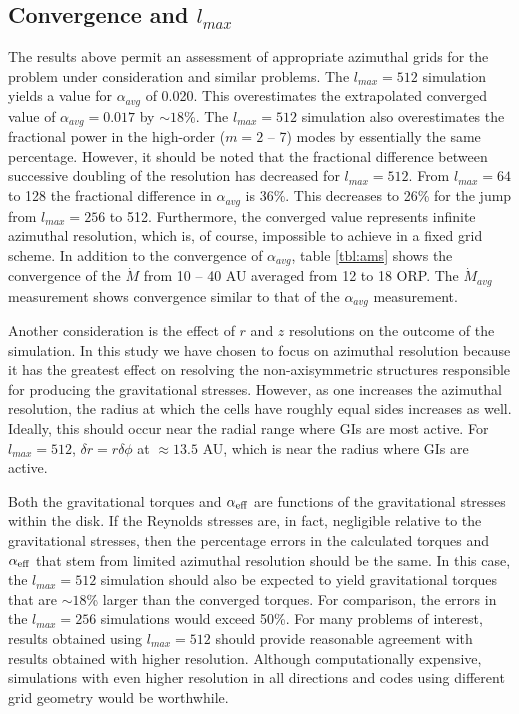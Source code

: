 \documentclass[manuscript]{aastex}
\begin{document}
\subsection{Convergence and $l_{max}$}

The results above permit an assessment of appropriate azimuthal grids for the
problem under consideration and similar problems. The $l_{max} = 512$ simulation yields a value 
for $\alpha_{avg}$ of 0.020. This overestimates the extrapolated converged value of $\alpha_{avg}
= 0.017$ by $\sim 18$\%. The $l_{max} = 512$ simulation also overestimates the fractional
power in the high-order ($m = 2$ -- 7) modes by essentially the same percentage. However, it should be noted that the fractional difference between successive doubling of the resolution has decreased for $l_{max} = 512$. From $l_{max} =64$ to 128 the fractional difference in $\alpha_{avg}$ is 36\%. This decreases to 26\% for the jump from $l_{max} = 256$ to 512. Furthermore, the converged value represents infinite azimuthal resolution, which is, of course, impossible to achieve in a fixed grid scheme. 
In addition to the convergence of $\alpha_{avg}$, table \ref{tbl:ams} shows the convergence of the $\dot{M}$
from 10 -- 40 AU averaged from 12 to 18 ORP. The $\dot{M}_{avg}$ measurement shows convergence similar to that
of the $\alpha_{avg}$ measurement.

Another consideration is the effect of $r$ and $z$ resolutions on the outcome of the simulation. In this study we have chosen to focus on azimuthal resolution because it has the greatest effect on resolving the non-axisymmetric
structures responsible for producing the gravitational stresses. However, as one increases the azimuthal resolution, the radius at which the cells have roughly equal sides increases as well. Ideally, this should occur near the radial range where GIs are most active. For $l_{max} = 512$, $\delta r = r \delta \phi $ at $\approx 13.5$ AU, which is near the radius where GIs are active.

Both the gravitational torques and $\alpha_{\rm{eff}}$ are functions of the
gravitational stresses within the disk.  If the Reynolds stresses are, in fact, negligible relative to the gravitational stresses,
then the percentage errors in the calculated torques and $\alpha_{\rm{eff}}$ that stem from limited azimuthal resolution 
should be the same. In this case, the  $l_{max} = 512$ simulation should also be expected to yield
gravitational torques that are $\sim 18$\% larger than the converged torques.  For comparison, the
errors in the $l_{max} = 256$ simulations would exceed 50\%. For many problems of interest,
results obtained using $l_{max} = 512$ should provide reasonable agreement with results obtained 
with higher resolution. 
Although computationally expensive, simulations with even higher resolution in all directions and codes using different grid geometry
would be worthwhile.
\end{document}
